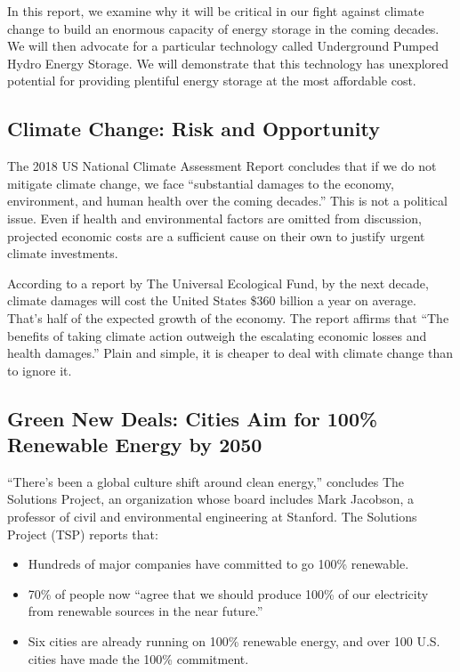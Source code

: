 \documentclass[hidelinks,12pt,a4paper]{article}
\begin{document}
In this report, we examine why it will be critical in our fight against climate change to build an enormous capacity of energy storage in the coming decades. We will then advocate for a particular technology called Underground Pumped Hydro Energy Storage. We will demonstrate that this technology has unexplored potential for providing plentiful energy storage at the most affordable cost.

\subsection{Climate Change: Risk and Opportunity}
The 2018 US National Climate Assessment Report concludes that if we do not mitigate climate change, we face “substantial damages to the economy, environment, and human health over the coming decades.” \cite{NationalClimateAssessmentReport} This is not a political issue. Even if health and environmental factors are omitted from discussion, projected economic costs are a sufficient cause on their own to justify urgent climate investments.

According to a report by The Universal Ecological Fund, by the next decade, climate damages will cost the United States \$360 billion a year on average. That's half of the expected growth of the economy. \cite{TheEconomicCaseForClimateActionInTheUnitedStates} The report affirms that “The benefits of taking climate action outweigh the escalating economic losses and health damages.” \cite{TheEconomicCaseForClimateActionInTheUnitedStates} Plain and simple, it is cheaper to deal with climate change than to ignore it.

\subsection{Green New Deals: Cities Aim for 100\% Renewable Energy by 2050}
“There’s been a global culture shift around clean energy,” \cite{TheSolutionsProject2018ImpactReport} concludes The Solutions Project, an organization whose board includes Mark Jacobson, a professor of civil and environmental engineering at Stanford. The Solutions Project (TSP) reports that: \cite{TheSolutionsProject2018ImpactReport}

{\footnotesize
\begin{itemize}
    \item Hundreds of major companies have committed to go 100\% renewable.
    \item 70\% of people now “agree that we should produce 100\% of our electricity from renewable sources in the near future.”
    \item Six cities are already running on 100\% renewable energy, and over 100 U.S. cities have made the 100\% commitment.
\end{itemize}
}
\end{document}
